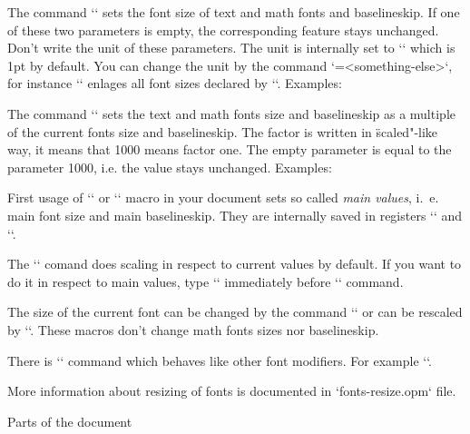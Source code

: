 The command `` sets the font size of text and
math fonts and baselineskip. If one of these two parameters is empty, the
corresponding feature stays unchanged. Don't write the unit of these
parameters. The unit is internally set to `\ptunit` which is 1pt by default.
You can change the unit by the command `\ptunit=<something-else>`, 
for instance `\ptunit=1mm` enlages all font sizes declared by `\typosize`.
Examples:

\begtt
\typosize[10/12]   %
\typosize[11/12.5] %
\typosize[8/]      %
\endtt

The command
``
sets the text and math fonts
size and baselineskip as a multiple of the current fonts size and
baselineskip. The factor is written in \"scaled"-like way, it means that 1000
means factor one. The empty parameter is equal to the parameter 1000,
i.e. the value stays unchanged. Examples:

\begtt
\typoscale[800/800]    %
\typoscale[\magstep2/] %
\endtt

First usage of `\typosize` or `\typoscale` macro in your document sets so
called {\em main values}, i.\ e. main font size and main baselineskip. They are internally 
saved in registers `\mainfosize` and `\mainbaselineskip`. 

\new
The `\typoscale` comand does scaling in respect to current values by default. 
If you want to do it in respect to main values, type `\scalemain` immediately
before `\typoscale` command.

\begtt
\typosize[12/14.4] %
\typosize[15/18]   %
\scalemain \typoscale[800/800] %
\endtt

The size of the current font can be changed by the command
`` or can be rescaled by
`\thefontscale[<factor>]`. These macros don't change math fonts sizes nor
baselineskip.

\new
There is `` command which behaves like other
font modifiers. For example `\currvar`.

More information about resizing of fonts is documented in `fonts-resize.opm`
file. 


\sec Parts of the document

